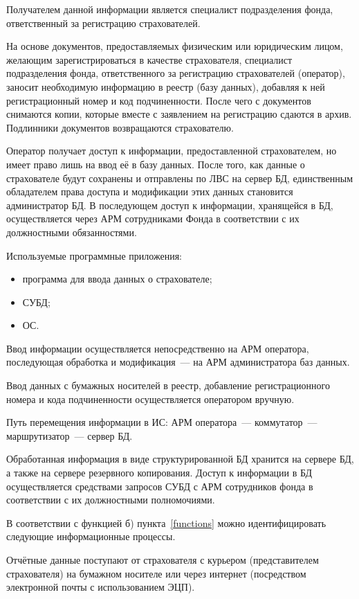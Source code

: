 Получателем данной информации является специалист подразделения фонда,
ответственный за регистрацию страхователей.

\point На основе документов, предоставляемых физическим или
юридическим лицом, желающим зарегистрироваться в качестве
страхователя, специалист подразделения фонда, ответственного за
регистрацию страхователей (оператор), заносит необходимую информацию в
реестр (базу данных), добавляя к ней регистрационный номер и код
подчиненности. После чего с документов снимаются копии, которые вместе
с заявлением на регистрацию сдаются в архив. Подлинники документов
возвращаются страхователю.

\point Оператор получает доступ к информации, предоставленной
страхователем, но имеет право лишь на ввод её в базу данных. После
того, как данные о страхователе будут сохранены и отправлены по ЛВС на
сервер БД, единственным обладателем права доступа и модификации этих
данных становится администратор БД. В последующем доступ к информации,
хранящейся в БД, осуществляется через АРМ сотрудниками Фонда в
соответствии с их должностными обязанностями.

\point Используемые программные приложения:

\begin{itemize}
\item программа для ввода данных о страхователе;
\item СУБД;
\item ОС.
\end{itemize}

\point Ввод информации осуществляется непосредственно на АРМ
оператора, последующая обработка и модификация~--- на АРМ
администратора баз данных.

Ввод данных с бумажных носителей в реестр, добавление регистрационного
номера и кода подчиненности осуществляется оператором вручную.

\point Путь перемещения информации в ИС: АРМ оператора~---
коммутатор~--- маршрутизатор~--- сервер БД.

\point Обработанная информация в виде структурированной БД хранится на
сервере БД, а также на сервере резервного копирования. Доступ к
информации в БД осуществляется средствами запросов СУБД с АРМ
сотрудников фонда в соответствии с их должностными полномочиями.

В соответствии с функцией б) пункта~\ref{functions} можно
идентифицировать следующие информационные процессы.

\point Отчётные данные поступают от страхователя с курьером
(представителем страхователя) на бумажном носителе или через интернет
(посредством электронной почты с использованием ЭЦП).


